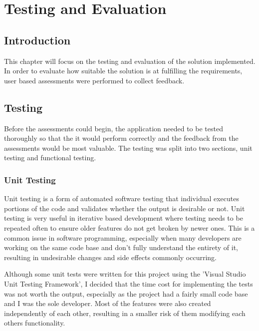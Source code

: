 
\chapter{Testing and Evaluation} %

\label{Chapter6} %


\section{Introduction}

This chapter will focus on the testing and evaluation of the solution implemented. In order to evaluate how suitable the solution is at fulfilling the requirements, user based assessments were performed to collect feedback.

\section{Testing}

Before the assessments could begin, the application needed to be tested thoroughly so that the it would perform correctly and the feedback from the assessments would be most valuable. The testing was split into two sections, unit testing and functional testing.

\subsection{Unit Testing}

Unit testing is a form of automated software testing that individual executes portions of the code and validates whether the output is desirable or not. Unit testing is very useful in iterative based development where testing needs to be repeated often to ensure older features do not get broken by newer ones. This is a common issue in software programming, especially when many developers are working on the same code base and don't fully understand the entirety of it, resulting in undesirable changes and side effects commonly occurring.

Although some unit tests were written for this project using the 'Visual Studio Unit Testing Framework', I decided that the time cost for implementing the tests was not worth the output, especially as the project had a fairly small code base and I was the sole developer. Most of the features were also created independently of each other, resulting in a smaller risk of them modifying each others functionality.

